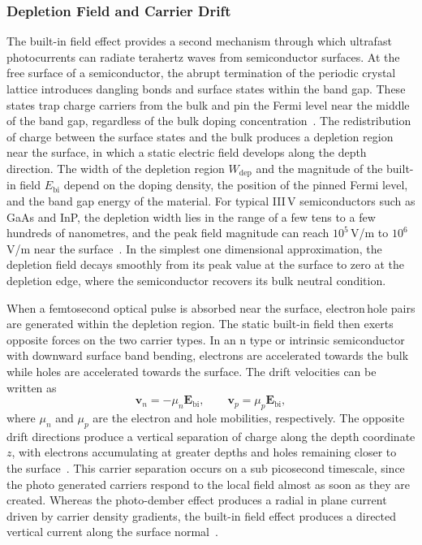 \documentclass[12pt]{final_project_report}
\begin{document}
\subsubsection{Depletion Field and Carrier Drift}

The built-in field effect provides a second mechanism through which ultrafast photocurrents can radiate terahertz waves from semiconductor surfaces. At the free surface of a semiconductor, the abrupt termination of the periodic crystal lattice introduces dangling bonds and surface states within the band gap. These states trap charge carriers from the bulk and pin the Fermi level near the middle of the band gap, regardless of the bulk doping concentration~\cite{SimulationTHz,Pettine2023}. The redistribution of charge between the surface states and the bulk produces a depletion region near the surface, in which a static electric field develops along the depth direction. The width of the depletion region $W_{\mathrm{dep}}$ and the magnitude of the built-in field $E_{\mathrm{bi}}$ depend on the doping density, the position of the pinned Fermi level, and the band gap energy of the material. For typical III\,V semiconductors such as GaAs and InP, the depletion width lies in the range of a few tens to a few hundreds of nanometres, and the peak field magnitude can reach $10^{5}$\,V/m to $10^{6}$\,V/m near the surface~\cite{SimulationTHz}. In the simplest one dimensional approximation, the depletion field decays smoothly from its peak value at the surface to zero at the depletion edge, where the semiconductor recovers its bulk neutral condition.

When a femtosecond optical pulse is absorbed near the surface, electron\,hole pairs are generated within the depletion region. The static built-in field then exerts opposite forces on the two carrier types. In an n type or intrinsic semiconductor with downward surface band bending, electrons are accelerated towards the bulk while holes are accelerated towards the surface. The drift velocities can be written as
\begin{equation}
    \mathbf{v}_n = -\mu_n \mathbf{E}_{\mathrm{bi}}, \qquad
    \mathbf{v}_p = \mu_p \mathbf{E}_{\mathrm{bi}},
    \label{eq:drift_velocities}
\end{equation}
where $\mu_n$ and $\mu_p$ are the electron and hole mobilities, respectively. The opposite drift directions produce a vertical separation of charge along the depth coordinate $z$, with electrons accumulating at greater depths and holes remaining closer to the surface~\cite{auston_picosecond_1984,SimulationTHz}. This carrier separation occurs on a sub picosecond timescale, since the photo generated carriers respond to the local field almost as soon as they are created. Whereas the photo-dember effect produces a radial in plane current driven by carrier density gradients, the built-in field effect produces a directed vertical current along the surface normal~\cite{Pettine2023,YangTonouchi2022}.
\end{document}

